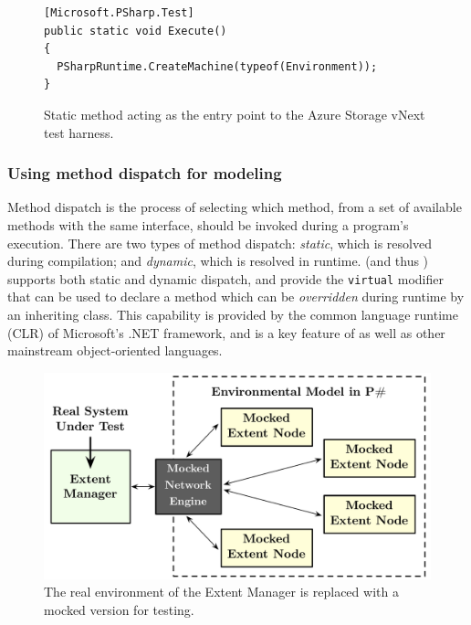 \begin{figure}[t]
\begin{lstlisting}
[Microsoft.PSharp.Test]
public static void Execute()
{
  PSharpRuntime.CreateMachine(typeof(Environment));
}
\end{lstlisting}
\vspace{-2mm}
\caption{Static \csharp method acting as the entry point to the Azure Storage vNext \psharp test harness.}
\label{fig:entrypoint}
\end{figure}

\subsubsection{Using method dispatch for modeling}
\label{sec:method:model:dispath}

Method dispatch is the process of selecting which method, from a set of available methods with the same interface, should be invoked during a program's execution. There are two types of method dispatch: \emph{static}, which is resolved during compilation; and \emph{dynamic}, which is resolved in runtime.  \csharp (and thus \psharp) supports both static and dynamic dispatch, and provide the \texttt{virtual} modifier that can be used to declare a method which can be \emph{overridden} during runtime by an inheriting class. This capability is provided by the common language runtime (CLR) of Microsoft's .NET framework, and is a key feature of \csharp as well as other mainstream object-oriented languages.

\begin{figure}[t]
\centering
\includegraphics[width=\linewidth]{img/mocked_engine}
\caption{The real environment of the Extent Manager is replaced with a mocked version for testing.}
\label{fig:azurestoremodel}
\end{figure}

